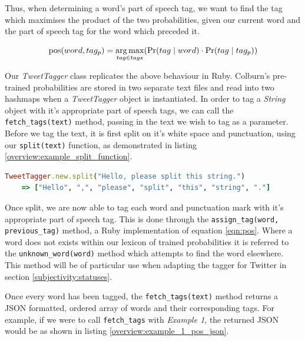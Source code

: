 Thus, when determining a word's part of speech tag, we want to find the tag which maximises the product of the two probabilities, given our current word and the part of speech tag for the word which preceded it.

\begin{equation}
	\label{eqn:pos}
	\operatorname*{pos}(word,tag_{p}) = \operatorname*{arg\,max}_{tag \in tags} (\Pr(tag \mid word) \cdot \Pr(tag \mid tag_{p}))
\end{equation}

Our \emph{TweetTagger} class replicates the above behaviour in Ruby. Colburn's pre-trained probabilities are stored in two separate text files and read into two hashmaps when a \emph{TweetTagger} object is instantiated. In order to tag a \emph{String} object with it's appropriate part of speech tags, we can call the \texttt{fetch\_tags(text)} method, passing in the text we wish to tag as a parameter. Before we tag the text, it is first split on it's white space and punctuation, using our \texttt{split(text)} function, as demonstrated in listing \ref{overview:example_split_function}.

\begin{lstlisting}[language=Ruby, numbers=none, caption={Example use of split function}, label=overview:example_split_function]
TweetTagger.new.split("Hello, please split this string.")
	=> ["Hello", ",", "please", "split", "this", "string", "."]
\end{lstlisting}

Once split, we are now able to tag each word and punctuation mark with it's appropriate part of speech tag. This is done through the \texttt{assign\_tag\-(word\-, \-previous\_tag)} method, a Ruby implementation of equation \ref{eqn:pos}. Where a word does not exists within our lexicon of trained probabilities it is referred to the \texttt{unknown\_word\-(word)} method which attempts to find the word elsewhere. This method will be of particular use when adapting the tagger for Twitter in section \ref{subjectivity:statuses}.

Once every word has been tagged, the \texttt{fetch\_tags(text)} method returns a JSON formatted, ordered array of words and their corresponding tags. For example, if we were to call \texttt{fetch\_tags} with \emph{Example 1}, the returned JSON would be as shown in listing \ref{overview:example_1_pos_json}.


